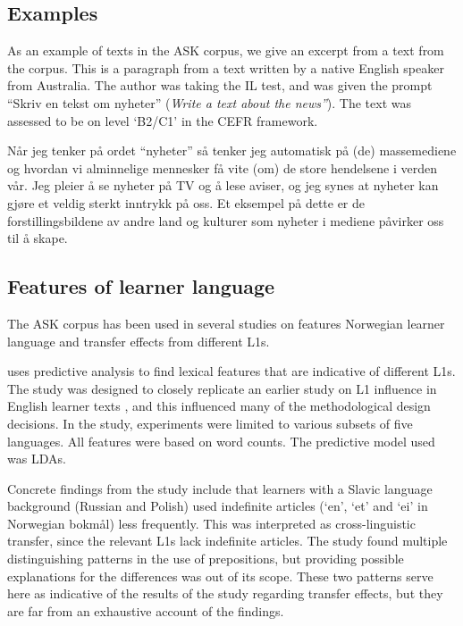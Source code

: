 \subsection{Examples}

As an example of texts in the ASK corpus, we give an excerpt from a text from
the corpus. This is a paragraph from a text written by a native English
speaker from Australia. The author was taking the IL test, and was given the
prompt ``Skriv en tekst om nyheter'' (\emph{Write a text about the news''}).
The text was assessed to be on level `B2/C1' in the CEFR framework.

\begin{displayquote}  %
  Når jeg tenker på ordet ``nyheter'' så tenker jeg automatisk på (de)
  massemediene og hvordan vi alminnelige mennesker få vite (om) de store
  hendelsene i verden vår. Jeg pleier å se nyheter på TV og å lese aviser, og
  jeg synes at nyheter kan gjøre et veldig sterkt inntrykk på oss. Et
  eksempel på dette er de forstillingsbildene av andre land og kulturer som
  nyheter i mediene påvirker oss til å skape.
\end{displayquote}


\subsection{Features of learner language}

The ASK corpus has been used in several studies on features Norwegian learner
language and transfer effects from different \acp{L1}.

\textcite{pepper2012} uses predictive analysis to find lexical features that
are indicative of different \acp{L1}. The study was designed to closely
replicate an earlier study on \ac{L1} influence in English learner texts
\autocite{jarvis2012detecting}, and this influenced many of the
methodological design decisions. In the \citeauthor{pepper2012} study,
experiments were limited to various subsets of five languages. All features
were based on word counts. The predictive model used was \acp{LDA}.

Concrete findings from the \citeauthor{pepper2012} study include that
learners with a Slavic language background (Russian and Polish) used
indefinite articles (`en', `et' and `ei' in Norwegian bokmål) less
frequently. This was interpreted as cross-linguistic transfer, since the
relevant \acp{L1} lack indefinite articles. The study found multiple
distinguishing patterns in the use of prepositions, but providing possible
explanations for the differences was out of its scope. These two patterns
serve here as indicative of the results of the study regarding transfer
effects, but they are far from an exhaustive account of the findings.

